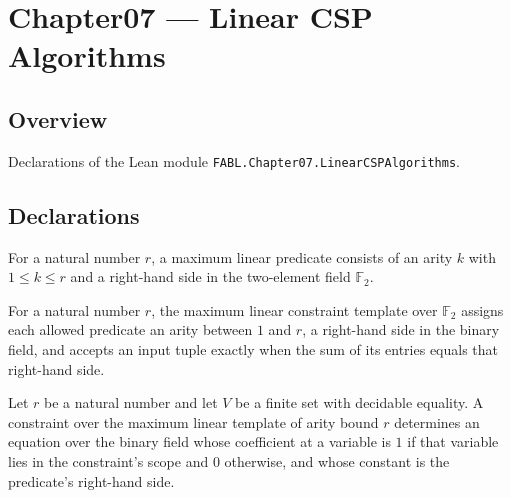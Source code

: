 \chapter{Chapter07 — Linear CSP Algorithms}
\section{Overview}

Declarations of the Lean module \texttt{FABL.Chapter07.LinearCSPAlgorithms}.

\section{Declarations}

\begin{definition}
\label{FABL.MaxLinearPredicate}
\leanok
{}
For a natural number $r$, a maximum linear predicate consists of an arity $k$ with $1\le
k\le r$ and a right-hand side in the two-element field $\mathbb F_2$.
\end{definition}

\begin{definition}
\label{FABL.maxLinearTemplate}
\leanok
{}
For a natural number $r$, the maximum linear constraint template over $\mathbb{F}_2$ assigns
each allowed predicate an arity between $1$ and $r$, a right-hand side in the binary
field, and accepts an input tuple exactly when the sum of its entries equals that
right-hand side.
\end{definition}

\begin{definition}
\leanok
{}
Let $r$ be a natural number and let $V$ be a finite set with decidable equality. A
constraint over the maximum linear template of arity bound $r$ determines an equation
over the binary field whose coefficient at a variable is $1$ if that variable lies in
the constraint's scope and $0$ otherwise, and whose constant is the predicate's
right-hand side.
\end{definition}

